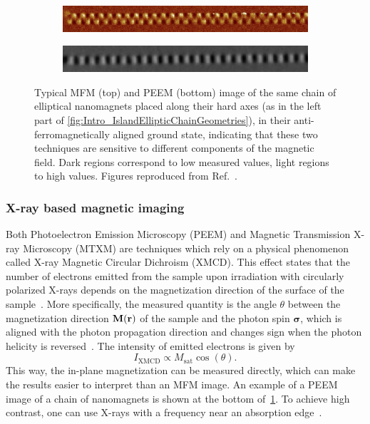 \documentclass[11pt,a4paper,english,twoside]{article}
\renewcommand{\vec}[1]{\boldsymbol{#1}}
\begin{document}
\begin{figure}
     \centering
     \begin{subfigure}[b]{0.8\textwidth}
         \centering
         \includegraphics[width=\textwidth]{Figures/Introduction/NML_Carlton - Figure 1.15 cropped.png}
     \end{subfigure}
     \begin{subfigure}[b]{0.8\textwidth}
         \centering
         \includegraphics[width=\textwidth]{Figures/Introduction/NML_Carlton - Figure 1.17 cropped.png}
     \end{subfigure}
     \caption{Typical MFM (top) and PEEM (bottom) image of the same chain of elliptical nanomagnets placed along their hard axes (as in the left part of \cref{fig:Intro_IslandEllipticChainGeometries}), in their anti-ferromagnetically aligned ground state, indicating that these two techniques are sensitive to different components of the magnetic field. Dark regions correspond to low measured values, light regions to high values. Figures reproduced from Ref.~\cite{NML_Carlton}.}
     \label{fig:Intro_Imaging}
\end{figure}

\subsubsection{X-ray based magnetic imaging}
Both Photoelectron Emission Microscopy (PEEM) and Magnetic Transmission X-ray Microscopy (MTXM) are techniques which rely on a physical phenomenon called X-ray Magnetic Circular Dichroism (XMCD). This effect states that the number of electrons emitted from the sample upon irradiation with circularly polarized X-rays depends on the magnetization direction of the surface of the sample~\cite{NML_Carlton}. More specifically, the measured quantity is the angle $\theta$ between the magnetization direction $\vb{M(\vb{r})}$ of the sample and the photon spin $\vec{\sigma}$, which is aligned with the photon propagation direction and changes sign when the photon helicity is reversed~\cite{PEEM}. The intensity of emitted electrons is given by
\begin{equation}
    I_{\mathrm{XMCD}} \propto M_\mathrm{sat} \cos(\theta) \mathrm{.}
    \label{eq:XMCD}
\end{equation} 
This way, the in-plane magnetization can be measured directly, which can make the results easier to interpret than an MFM image. An example of a PEEM image of a chain of nanomagnets is shown at the bottom of~\cref{fig:Intro_Imaging}. To achieve high contrast, one can use X-rays with a frequency near an absorption edge~\cite{SubnanosecondPropagation_AnisotropyChains}. \par
\end{document}
